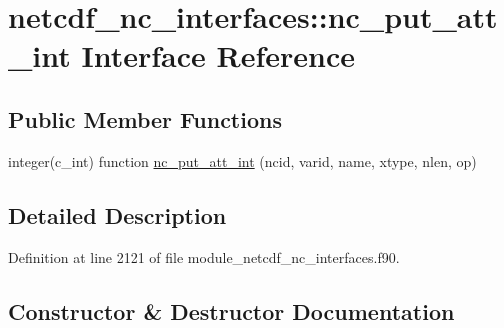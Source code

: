 \hypertarget{interfacenetcdf__nc__interfaces_1_1nc__put__att__int}{}\section{netcdf\+\_\+nc\+\_\+interfaces\+:\+:nc\+\_\+put\+\_\+att\+\_\+int Interface Reference}
\label{interfacenetcdf__nc__interfaces_1_1nc__put__att__int}
\subsection*{Public Member Functions}
\begin{DoxyCompactItemize}
\item 
integer(c\+\_\+int) function \hyperlink{interfacenetcdf__nc__interfaces_1_1nc__put__att__int_a178050673649c1dda3b078331c3e58c4}{nc\+\_\+put\+\_\+att\+\_\+int} (ncid, varid, name, xtype, nlen, op)
\end{DoxyCompactItemize}


\subsection{Detailed Description}


Definition at line 2121 of file module\+\_\+netcdf\+\_\+nc\+\_\+interfaces.\+f90.



\subsection{Constructor \& Destructor Documentation}
\mbox{\label{interfacenetcdf__nc__interfaces_1_1nc__put__att__int_a178050673649c1dda3b078331c3e58c4}} 
